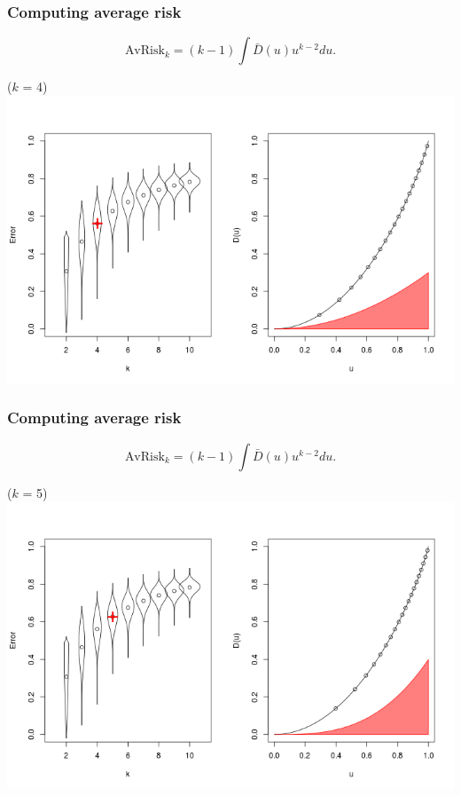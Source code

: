 \documentclass{beamer}
\begin{document}
\begin{frame}
\frametitle{Computing average risk}
\[
\text{AvRisk}_k = (k-1) \int \bar{D}(u) u^{k-2} du.
\]
\begin{center}
($k$ = 4)
\includegraphics[scale = 0.4, clip=true, trim=0 0.1in 0 0.7in]{../extrapolation/rho_0_7_fmla4.png}
\end{center}
\end{frame}

\begin{frame}
\frametitle{Computing average risk}
\[
\text{AvRisk}_k = (k-1) \int \bar{D}(u) u^{k-2} du.
\]
\begin{center}
($k$ = 5)
\includegraphics[scale = 0.4, clip=true, trim=0 0.1in 0 0.7in]{../extrapolation/rho_0_7_fmla5.png}
\end{center}
\end{frame}
\end{document}
